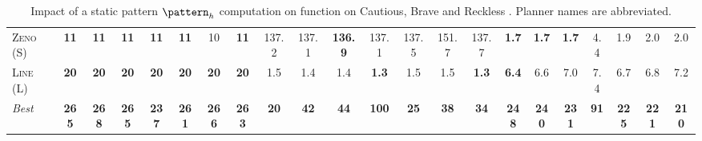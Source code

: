 \documentclass[11pt,landscape]{article}
\begin{document}
\begin{table}[tb]
{\begin{tabular}{|l||ccccccc||ccccccc||ccccccc||}
\textsc{Zeno} (S)&\textbf{11}&\textbf{11}&\textbf{11}&\textbf{11}&\textbf{11}&10&\textbf{11}&137.2&137.1&\textbf{136.9}&137.1&137.5&151.7&137.7&\textbf{1.7}&\textbf{1.7}&\textbf{1.7}&4.4&1.9&2.0&2.0\\
\textsc{Line} (L)&\textbf{20}&\textbf{20}&\textbf{20}&\textbf{20}&\textbf{20}&\textbf{20}&\textbf{20}&1.5&1.4&1.4&\textbf{1.3}&1.5&1.5&\textbf{1.3}&\textbf{6.4}&6.6&7.0&7.4&6.7&6.8&7.2
\\\hline
\textit{Best}&\textbf{265}&\textbf{268}&\textbf{265}&\textbf{237}&\textbf{261}&\textbf{266}&\textbf{263}&\textbf{20}&\textbf{42}&\textbf{44}&\textbf{100}&\textbf{25}&\textbf{38}&\textbf{34}&\textbf{248}&\textbf{240}&\textbf{231}&\textbf{91}&\textbf{225}&\textbf{221}&\textbf{210}\\\hline

        \end{tabular}}
        \caption{Impact of a static pattern $\pattern_h$ computation on function on Cautious, Brave and Reckless \pattyd. Planner names are abbreviated.}
        \label{tab:abl-patternh-static}
        \end{table}
        
\end{document}
